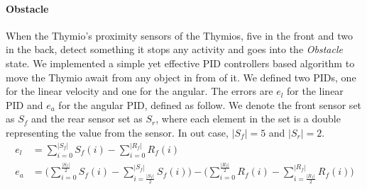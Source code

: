 \documentclass[letterpaper, 10 pt, conference]{ieeeconf}  %
\begin{document}
\paragraph{Obstacle} When the Thymio's proximity sensors of the Thymios, five in the front and two in the back, detect something it stops any activity and goes into the \emph{Obstacle} state. We implemented a simple yet effective PID controllers based algorithm to move the Thymio await from any object in from of it. 
We defined two PIDs, one for the linear velocity and one for the angular. The errors are $e_l$ for the linear PID and $e_a$ for the angular PID, defined as follow. We denote the front sensor set as $S_f$ and the rear sensor set as $S_r$, where each element in the set is a double representing the value from the sensor. In out case, $|S_f| = 5$ and $|S_r|=2$.
\begin{align}
	e_l &= \limits\sum_{i=0}^{|S_f|} S_f(i) - \limits\sum_{i = 0}^{|R_f|} R_f(i) \\
	e_a &= (\limits\sum_{i=0}^{\frac{|S_f|}{2}} S_f(i) - \limits\sum_{i = \frac{|S_f|}{2} }^{|S_f|} S_f(i)) - 
	(\limits\sum_{i=0}^{\frac{|R_f|}{2}} R_f(i) - \limits\sum_{i = \frac{|R_f|}{2} }^{|R_f|} R_f(i))
	\end{align}
\end{document}
